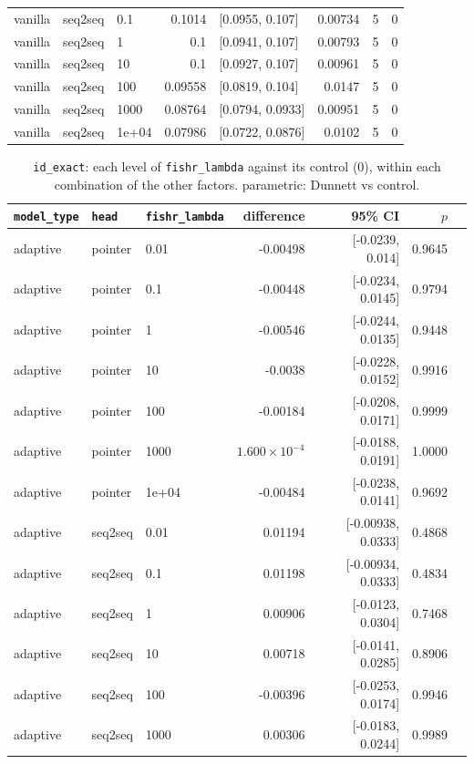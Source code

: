 \documentclass[10pt]{article}
\begin{document}
{\begin{longtable}{lllrlrrr}
vanilla & seq2seq & 0.1 & 0.1014 & [0.0955, 0.107] & 0.00734 & 5 & 0\\
vanilla & seq2seq & 1 & 0.1 & [0.0941, 0.107] & 0.00793 & 5 & 0\\
vanilla & seq2seq & 10 & 0.1 & [0.0927, 0.107] & 0.00961 & 5 & 0\\
vanilla & seq2seq & 100 & 0.09558 & [0.0819, 0.104] & 0.0147 & 5 & 0\\
vanilla & seq2seq & 1000 & 0.08764 & [0.0794, 0.0933] & 0.00951 & 5 & 0\\
vanilla & seq2seq & 1e+04 & 0.07986 & [0.0722, 0.0876] & 0.0102 & 5 & 0\\
\bottomrule
\end{longtable}
}

{\small
\begin{longtable}{lllrrrl}
\caption{\texttt{id\_exact}: each level of \texttt{fishr\_lambda} against its control (0), within each combination of the other factors. parametric: Dunnett vs control.}\label{tab:control-id_exact}\\
\toprule
\texttt{model\_type} & \texttt{head} & \texttt{fishr\_lambda} & difference & 95\% CI & $p$ & \\
\midrule
\endhead
adaptive & pointer & 0.01 & -0.00498 & [-0.0239, 0.014] & 0.9645 & \\
adaptive & pointer & 0.1 & -0.00448 & [-0.0234, 0.0145] & 0.9794 & \\
adaptive & pointer & 1 & -0.00546 & [-0.0244, 0.0135] & 0.9448 & \\
adaptive & pointer & 10 & -0.0038 & [-0.0228, 0.0152] & 0.9916 & \\
adaptive & pointer & 100 & -0.00184 & [-0.0208, 0.0171] & 0.9999 & \\
adaptive & pointer & 1000 & $1.600\times10^{-4}$ & [-0.0188, 0.0191] & 1.0000 & \\
adaptive & pointer & 1e+04 & -0.00484 & [-0.0238, 0.0141] & 0.9692 & \\
adaptive & seq2seq & 0.01 & 0.01194 & [-0.00938, 0.0333] & 0.4868 & \\
adaptive & seq2seq & 0.1 & 0.01198 & [-0.00934, 0.0333] & 0.4834 & \\
adaptive & seq2seq & 1 & 0.00906 & [-0.0123, 0.0304] & 0.7468 & \\
adaptive & seq2seq & 10 & 0.00718 & [-0.0141, 0.0285] & 0.8906 & \\
adaptive & seq2seq & 100 & -0.00396 & [-0.0253, 0.0174] & 0.9946 & \\
adaptive & seq2seq & 1000 & 0.00306 & [-0.0183, 0.0244] & 0.9989 & \\

\end{longtable}}
\end{document}
